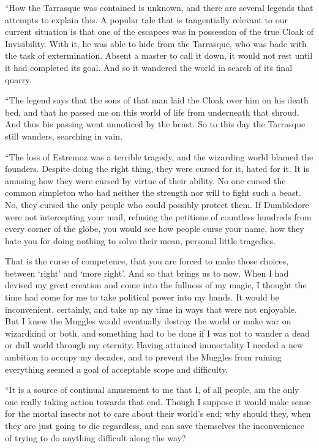 “How the Tarrasque was contained is unknown, and there are several legends that attempts to explain this. A popular tale that is tangentially relevant to our current situation is that one of the escapees was in possession of the true Cloak of Invisibility. With it, he was able to hide from the Tarrasque, who was bade with the task of extermination. Absent a master to call it down, it would not rest until it had completed its goal. And so it wandered the world in search of its final quarry.

“The legend says that the sons of that man laid the Cloak over him on his death bed, and that he passed me on this world of life from underneath that shroud. And thus his passing went unnoticed by the beast. So to this day the Tarrasque still wanders, searching in vain.

“The loss of Estremoz was a terrible tragedy, and the wizarding world blamed the founders. Despite doing the right thing, they were cursed for it, hated for it. It is amusing how they were cursed by virtue of their ability. No one cursed the common simpleton who had neither the strength nor will to fight such a beast. No, they cursed the only people who could possibly protect them. If Dumbledore were not intercepting your mail, refusing the petitions of countless hundreds from every corner of the globe, you would see how people curse your name, how they hate you for doing nothing to solve their mean, personal little tragedies.

That is the curse of competence, that you are forced to make those choices, between ‘right’ and ‘more right’. And so that brings us to now. When I had devised my great creation and come into the fullness of my magic, I thought the time had come for me to take political power into my hands. It would be inconvenient, certainly, and take up my time in ways that were not enjoyable. But I knew the Muggles would eventually destroy the world or make war on wizardkind or both, and something had to be done if I was not to wander a dead or dull world through my eternity. Having attained immortality I needed a new ambition to occupy my decades, and to prevent the Muggles from ruining everything seemed a goal of acceptable scope and difficulty.

“It is a source of continual amusement to me that I, of all people, am the only one really taking action towards that end. Though I suppose it would make sense for the mortal insects not to care about their world’s end; why should they, when they are just going to die regardless, and can save themselves the inconvenience of trying to do anything difficult along the way?

